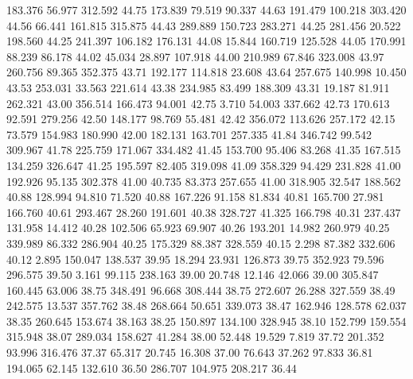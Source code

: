  183.376   56.977  312.592        44.75
 173.839   79.519   90.337        44.63
 191.479  100.218  303.420        44.56
  66.441  161.815  315.875        44.43
 289.889  150.723  283.271        44.25
 281.456   20.522  198.560        44.25
 241.397  106.182  176.131        44.08
  15.844  160.719  125.528        44.05
 170.991   88.239   86.178        44.02
  45.034   28.897  107.918        44.00
 210.989   67.846  323.008        43.97
 260.756   89.365  352.375        43.71
 192.177  114.818   23.608        43.64
 257.675  140.998   10.450        43.53
 253.031   33.563  221.614        43.38
 234.985   83.499  188.309        43.31
  19.187   81.911  262.321        43.00
 356.514  166.473   94.001        42.75
   3.710   54.003  337.662        42.73
 170.613   92.591  279.256        42.50
 148.177   98.769   55.481        42.42
 356.072  113.626  257.172        42.15
  73.579  154.983  180.990        42.00
 182.131  163.701  257.335        41.84
 346.742   99.542  309.967        41.78
 225.759  171.067  334.482        41.45
 153.700   95.406   83.268        41.35
 167.515  134.259  326.647        41.25
 195.597   82.405  319.098        41.09
 358.329   94.429  231.828        41.00
 192.926   95.135  302.378        41.00
  40.735   83.373  257.655        41.00
 318.905   32.547  188.562        40.88
 128.994   94.810   71.520        40.88
 167.226   91.158   81.834        40.81
 165.700   27.981  166.760        40.61
 293.467   28.260  191.601        40.38
 328.727   41.325  166.798        40.31
 237.437  131.958   14.412        40.28
 102.506   65.923   69.907        40.26
 193.201   14.982  260.979        40.25
 339.989   86.332  286.904        40.25
 175.329   88.387  328.559        40.15
   2.298   87.382  332.606        40.12
   2.895  150.047  138.537        39.95
  18.294   23.931  126.873        39.75
 352.923   79.596  296.575        39.50
   3.161   99.115  238.163        39.00
  20.748   12.146   42.066        39.00
 305.847  160.445   63.006        38.75
 348.491   96.668  308.444        38.75
 272.607   26.288  327.559        38.49
 242.575   13.537  357.762        38.48
 268.664   50.651  339.073        38.47
 162.946  128.578   62.037        38.35
 260.645  153.674   38.163        38.25
 150.897  134.100  328.945        38.10
 152.799  159.554  315.948        38.07
 289.034  158.627   41.284        38.00
  52.448   19.529    7.819        37.72
 201.352   93.996  316.476        37.37
  65.317   20.745   16.308        37.00
  76.643   37.262   97.833        36.81
 194.065   62.145  132.610        36.50
 286.707  104.975  208.217        36.44
